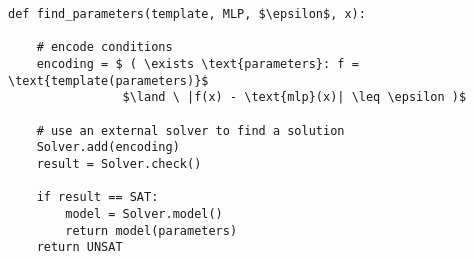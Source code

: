 \begin{lstlisting}[caption={Finding parameters within $\epsilon$.}, label=lst:smt_default, mathescape=true]
def find_parameters(template, MLP, $\epsilon$, x):

    # encode conditions
    encoding = $ ( \exists \text{parameters}: f = \text{template(parameters)}$
                $\land \ |f(x) - \text{mlp}(x)| \leq \epsilon )$

    # use an external solver to find a solution
    Solver.add(encoding)
    result = Solver.check()

    if result == SAT:
        model = Solver.model()
        return model(parameters)
    return UNSAT
\end{lstlisting}